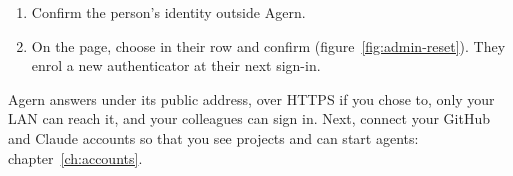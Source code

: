\begin{enumerate}
  \item Confirm the person's identity outside Agern.
  \item On the  page, choose  in their row and confirm
    (figure~\ref{fig:admin-reset}). They enrol a new authenticator at their next sign-in.
\end{enumerate}



\whatyouhave
Agern answers under its public address, over HTTPS if you chose to, only your LAN can reach it,
and your colleagues can sign in. Next, connect your GitHub and Claude accounts so that you see
projects and can start agents: chapter~\ref{ch:accounts}.
